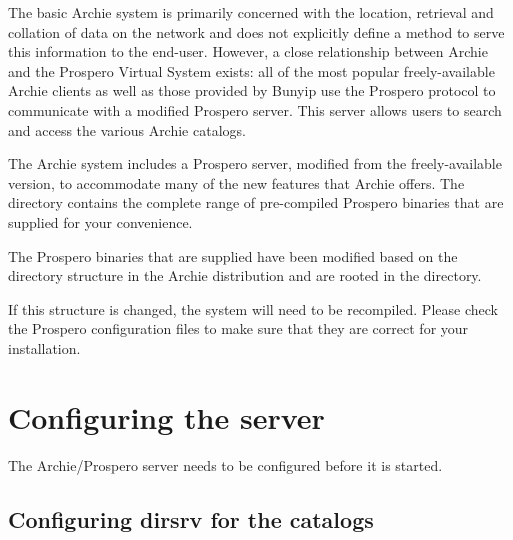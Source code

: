 %
%
%
%




The basic Archie system is primarily concerned with the location, retrieval
and collation of data on the network and does not explicitly define a method
to serve this information to the end-user. However, a close relationship
between Archie and the Prospero Virtual System exists: all of the most popular
freely-available Archie clients as well as those provided by Bunyip use the
Prospero protocol to communicate with a modified Prospero server. This server
allows users to search and access the various Archie catalogs.



The Archie system includes a Prospero server, modified from the
freely-available version, to accommodate many of the new features that Archie
offers. The directory  contains the complete range of
pre-compiled Prospero binaries that are supplied for your convenience.

The Prospero binaries that are supplied have been modified based on the
directory structure in the Archie distribution and are rooted in the
 directory.

If this structure is changed, the system will need to be recompiled. Please
check the Prospero configuration files to make sure that they are correct for
your installation.








\section{Configuring the server}

The Archie/Prospero server needs to be configured before it is started.




\subsection{Configuring dirsrv for the catalogs}

